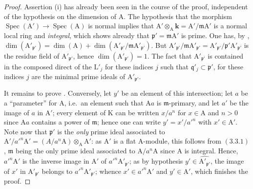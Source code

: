 \begin{proof}
Assertion (i) has already been seen in the course of the proof, independent of the hypothesis on the dimension of $\mathrm{A}$. The hypothesis that the morphism
$\operatorname{Spec}(\mathrm{A}')\to\operatorname{Spec}(\mathrm{A})$ is normal implies that $\mathrm{A}'\otimes_\mathrm{A}\boldsymbol{k}=\mathrm{A}'/\mathfrak{m}\mathrm{A}'$ is a normal local ring
and \emph{integral}, which shows already that $\mathfrak{p}'=\mathfrak{m}\mathrm{A}'$ is prime. One has,
by , $\dim(\mathrm{A}'_{\mathfrak{p}'})=\dim(\mathrm{A})+\dim(\mathrm{A}'_{\mathfrak{p}'}/\mathfrak{m}\mathrm{A}'_{\mathfrak{p}'})$. But $\mathrm{A}'_{\mathfrak{p}'}/\mathfrak{m}\mathrm{A}'_{\mathfrak{p}'}=\mathrm{A}'_{\mathfrak{p}'}/\mathfrak{p}'\mathrm{A}'_{\mathfrak{p}'}$ is
the residue field of $\mathrm{A}'_{\mathfrak{p}'}$, hence $\dim(\mathrm{A}'_{\mathfrak{p}'})=1$. The fact that $\mathrm{A}'_{\mathfrak{p}'}$ is contained in the composed
direct of the $\mathrm{L}'_j$ for these indices $j$ such that $\mathfrak{q}'_j\subset\mathfrak{p}'$, for these indices $j$ are
the minimal prime ideals of $\mathrm{A}'_{\mathfrak{p}'}$.

It remains to prove . Conversely, let $y'$ be an
element of this intersection; let $a$ be a ``parameter'' for $\mathrm{A}$, i.e.\ an element such that $\mathrm{A}a$ is $\mathfrak{m}$-primary,
and let $a'$ be the image of $a$ in $\mathrm{A}'$; every element of $\mathrm{K}$ can be written $x/a^n$ for $x\in\mathrm{A}$ and
$n>0$ since $\mathrm{A}a$ contains a power of $\mathfrak{m}$; hence one can write $y'=x'/a'^n$ with $x'\in\mathrm{A}'$.
Note now that $\mathfrak{p}'$ is the \emph{only} prime ideal associated to $\mathrm{A}'/a'^n\mathrm{A}'=(A/a^n\mathrm{A})\otimes_\mathrm{A}\mathrm{A}'$:
as $\mathrm{A}'$ is a flat $\mathrm{A}$-module, this follows from $(3.3.1)$, $\mathfrak{m}$ being the only prime ideal
associated to $\mathrm{A}/a^n\mathrm{A}$ since $\mathrm{A}$ is integral. Hence, $a'^n\mathrm{A}'$ is the inverse image in $\mathrm{A}'$
of $a'^n\mathrm{A}'_{\mathfrak{p}'}$; as by hypothesis $y'\in\widehat{\mathrm{A}'_{\mathfrak{p}'}}$, the image of $x'$ in $\mathrm{A}'_{\mathfrak{p}'}$ belongs to $a'^n\mathrm{A}'_{\mathfrak{p}'}$;
whence $x'\in a'^n\mathrm{A}'$ and $y'\in\mathrm{A}'$, which finishes the proof.


\end{proof}
